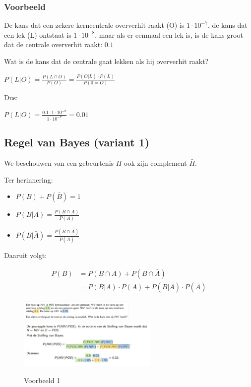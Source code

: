 \documentclass{article}
\begin{document}
\subsubsection{Voorbeeld}

De kans dat een zekere kerncentrale oververhit raakt (O) is $1\cdot 10^{-7}$,
de kans dat een lek (L) ontstaat is $1\cdot 10^{-8}$, maar als er eenmaal
een lek is, is de kans groot dat de centrale oververhit raakt: $0.1$

Wat is de kans dat de centrale gaat lekken als hij oververhit raakt?

$P(L|O) = \frac{P(L\cap O)}{P(O)} = \frac{P(O|L)\cdot P(L)}{P(0=O)}$

Dus:

$P(L|O) = \frac{0.1 \cdot 1 \cdot 10^{-8}}{1\cdot 10^{-7}} = 0.01$


\subsection{Regel van Bayes (variant 1)}

We beschouwen van een gebeurtenis $H$ ook zijn complement $\bar{H}$.

Ter herinnering:

\begin{itemize}
    \item $P(B) + P(\bar{B}) = 1$
    \item $P(B|A) = \frac{P(B \cap A)}{P(A)}$
    \item $P(B|\bar{A}) = \frac{P(B \cap \bar{A})}{P(\bar{A})}$
\end{itemize}

Daaruit volgt:

\begin{equation}
    \begin{aligned}
        P(B) & = P(B \cap A) + P(B \cap \bar{A})\\
        & = P(B | A) \cdot P(A) + P(B | \bar{A}) \cdot P(\bar{A})
    \end{aligned}
\end{equation}

\begin{figure}[H]
    \centering
    \includegraphics[width=0.5\textwidth]{bayes-variant-voorbeeld1.png}
    \includegraphics[width=0.6\textwidth]{bayes-variant-voorbeeld1-opl.png}
    \caption{Voorbeeld 1}
\end{figure}
\end{document}

